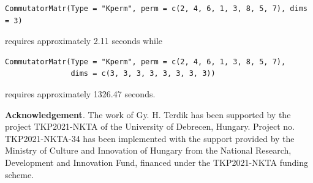\begin{verbatim}
CommutatorMatr(Type = "Kperm", perm = c(2, 4, 6, 1, 3, 8, 5, 7), dims = 3)
\end{verbatim}

requires approximately 2.11 seconds while

\begin{verbatim}
CommutatorMatr(Type = "Kperm", perm = c(2, 4, 6, 1, 3, 8, 5, 7), 
               dims = c(3, 3, 3, 3, 3, 3, 3, 3))
\end{verbatim}

requires approximately 1326.47 seconds.

\bigskip

\textbf{Acknowledgement}. The work of Gy. H. Terdik has been supported by the project TKP2021-NKTA of the University of Debrecen, Hungary.
Project no. TKP2021-NKTA-34 has been implemented with the support provided by the Ministry of Culture and Innovation of Hungary from the National Research, Development and Innovation Fund, financed under the TKP2021-NKTA funding scheme.



\address{%
György Terdik\\
University of Debrecen\\%
Department of Informatics\\ Debrecen, Hungary\\
%
%
\textit{ORCiD: \href{https://orcid.org/0000-0002-9663-6892}{0000-0002-9663-6892}}\\%
\href{mailto:terdik.gyorgy@inf.unideb.hu}{\nolinkurl{terdik.gyorgy@inf.unideb.hu}}%
}

\address{%
Emanuele Taufer\\
University of Trento\\%
Department of Economics and Management\\ Trento, Italy\\
%
%
\textit{ORCiD: \href{https://orcid.org/0000-0001-5140-9912}{0000-0001-5140-9912}}\\%
\href{mailto:emanuele.taufer@unitn.it}{\nolinkurl{emanuele.taufer@unitn.it}}%
}

